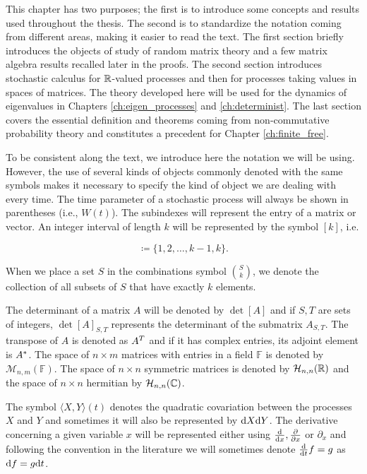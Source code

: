 This chapter has two purposes; the first is to introduce some concepts and results used throughout the thesis. The second is to standardize the notation coming from different areas, making it easier to read the text. The first section briefly introduces the objects of study of random matrix theory and a few matrix algebra results recalled later in the proofs. The second section introduces stochastic calculus for $\mathbb R$-valued processes and then for processes taking values in spaces of matrices. The theory developed here will be used for the dynamics of eigenvalues in Chapters \ref{ch:eigen_processes} and \ref{ch:determinist}. The last section covers the essential definition and theorems coming from non-commutative probability theory and constitutes a precedent for Chapter \ref{ch:finite_free}.

To be consistent along the text, we introduce here the notation we will be using. However, the use of several kinds of objects commonly denoted with the same symbols makes it necessary to specify the kind of object we are dealing with every time. The time parameter of a stochastic process will always be shown in parentheses (i.e., $W(t)$). The subindexes will represent the entry of a matrix or vector. An integer interval of length $k$ will be represented by the symbol $[k]$, i.e.

\begin{equation*}
    [k] \coloneqq \{1,2,\dots, k-1, k\}.
\end{equation*}

When we place a set $S$ in the combinations symbol $\binom{S}{k}$, we denote the collection of all subsets of $S$ that have exactly $k$ elements. 

The determinant of a matrix $A$ will be denoted by $\det[A]$ and if $S,T$ are sets of integers, $\det[A]_{S,T}$ represents the determinant of the submatrix $A_{S,T}$. The transpose of $A$ is denoted as $A^T$ and if it has complex entries, its adjoint element is $A^*$. The space of $n\times m$ matrices with entries in a field $\mathbb F$ is denoted by $\mathcal M_{n,m}(\mathbb F)$. The space of $n\times n$ symmetric matrices is denoted by $\mathcal H_{n,n}(\mathbb R)$ and the space of $n\times n$ hermitian by $\mathcal H_{n,n}(\mathbb C)$.

The symbol $\langle X,Y \rangle(t)$ denotes the quadratic covariation between the processes $X$ and $Y$ and sometimes it will also be represented by $\mathrm d X\mathrm d Y$. The derivative concerning a given variable $x$ will be represented either using $\frac{\mathrm d}{\mathrm d x}, \frac{\partial}{\partial x}$ or $\partial_x$ and following the convention in the literature we will sometimes denote $\frac{\mathrm d}{\mathrm d t} f = g$ as $\mathrm d f = g\mathrm d t$.

